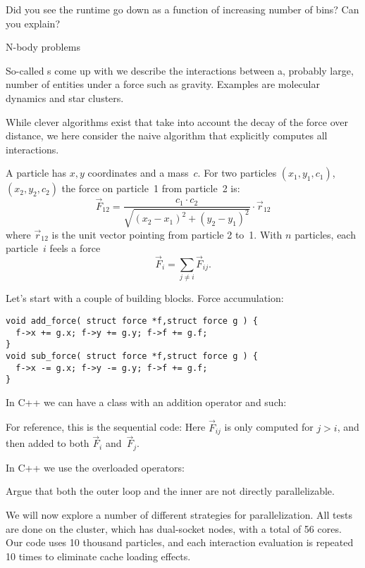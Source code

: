 Did you see the runtime go down as a function of increasing number of bins?
Can you explain?

 {N-body problems}

So-called s come up with
we describe the interactions between a,
probably large,
number of entities under a force such as gravity.
Examples are molecular dynamics and star clusters.

While clever algorithms exist that take into account the
decay of the force over distance,
we here consider the naive algorithm that
explicitly computes all interactions.

A particle has $x,y$ coordinates and a mass~$c$.
For two particles $(x_1,y_1,c_1)$, $(x_2,y_2,c_2)$
the force on particle~1 from particle~2 is:
\[ \overrightarrow F_{12} = \frac{c_1\cdot c_2}{\sqrt{ (x_2-x_1)^2+(y_2-y_1)^2 }} \cdot \overrightarrow r_{12} \]
where $\overrightarrow r_{12}$ is the unit vector pointing from particle 2 to~1.
With $n$ particles, each particle~$i$ feels a force
\[ \overrightarrow F_i = \sum_{j\not=i} \overrightarrow F_{ij}.\]

Let's start with a couple of building blocks.
Force accumulation:
\begin{lstlisting}
void add_force( struct force *f,struct force g ) {
  f->x += g.x; f->y += g.y; f->f += g.f;
}
void sub_force( struct force *f,struct force g ) {
  f->x -= g.x; f->y -= g.y; f->f += g.f;
}
\end{lstlisting}

In C++ we can have a class with an addition operator and such:
%

For reference, this is the sequential code:
Here $\overrightarrow F_{ij}$ is only computed for $j>i$, and then
added to both $\overrightarrow F_i$ and~$\overrightarrow F_j$.

In C++ we use the overloaded operators:
%

\begin{exercise}
  Argue that both the outer loop and the inner are not directly parallelizable.
\end{exercise}

We will now explore a number of different strategies for parallelization.
All tests are done on the  cluster,
which has dual-socket  nodes,
with a total of 56 cores.
Our code uses 10 thousand particles, and each interaction evaluation
is repeated 10 times to eliminate cache loading effects.

